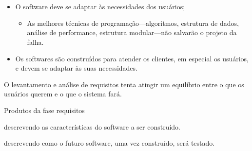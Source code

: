 
\lecturetitle{\course}{\insertlecture}

\section{\insertlecture}

\frame{\maketitle}

\begin{frame}{\insertlecture}
  
  \begin{itemize}[<+->]
  \item O software deve se adaptar às necessidades dos usuários;
    \begin{itemize}
    \item As melhores técnicas de programação---algoritmos, estrutura de dados, 
      análise de performance, estrutura modular---não salvarão o projeto da falha.
    \end{itemize}
  \item Os softwares são construídos para atender os clientes, em especial os usuários, 
    e devem se adaptar às suas necessidades.
  \end{itemize}

  \pause
  
  O levantamento e análise de requisitos tenta atingir um equilíbrio
  entre o que os usuários querem e o que o sistema fará.

\end{frame}

\begin{frame}{Produtos da fase requisitos}
  \begin{description}[<+->]
  \item[Documento de requisitos] descrevendo as características do
    software a ser construído.
  \item[Plano de validação] descrevendo como o futuro software, uma
    vez construído, será testado.
  \end{description}
\end{frame}

